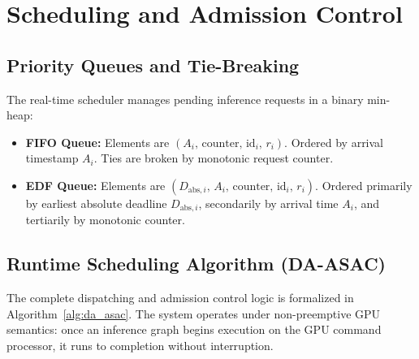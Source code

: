 \documentclass[conference]{IEEEtran}
\begin{document}
\section{Scheduling and Admission Control}

\subsection{Priority Queues and Tie-Breaking}
The real-time scheduler manages pending inference requests in a binary min-heap:
\begin{itemize}
    \item \textbf{FIFO Queue:} Elements are $(A_i, \, \text{counter}, \, \text{id}_i, \, r_i)$. Ordered by arrival timestamp $A_i$. Ties are broken by monotonic request counter.
    \item \textbf{EDF Queue:} Elements are $(D_{\text{abs}, i}, \, A_i, \, \text{counter}, \, \text{id}_i, \, r_i)$. Ordered primarily by earliest absolute deadline $D_{\text{abs}, i}$, secondarily by arrival time $A_i$, and tertiarily by monotonic counter.
\end{itemize}

\subsection{Runtime Scheduling Algorithm (DA-ASAC)}
The complete dispatching and admission control logic is formalized in Algorithm~\ref{alg:da_asac}. The system operates under non-preemptive GPU semantics: once an inference graph begins execution on the GPU command processor, it runs to completion without interruption.
\end{document}
